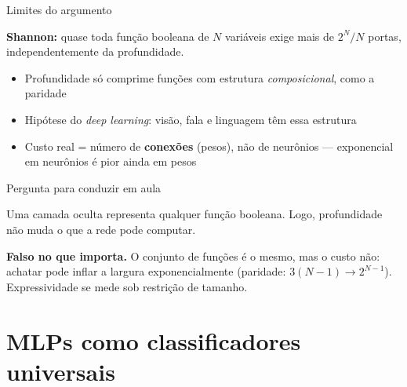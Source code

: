 \documentclass[aspectratio=169, 11pt]{beamer}
\begin{document}
\begin{frame}{Limites do argumento}

  \begin{alertabox}
    \textbf{Shannon:} quase toda função booleana de $N$ variáveis exige mais
    de $2^N/N$ portas, \alert{independentemente da profundidade}.
  \end{alertabox}

  \smallskip
  \begin{itemize}\setlength{\itemsep}{0.25ex}
    \item Profundidade só comprime funções com estrutura
          \emph{composicional}, como a paridade
    \item Hipótese do \emph{deep learning}: visão, fala e linguagem têm
          essa estrutura
    \item Custo real = número de \textbf{conexões} (pesos), não de
          neurônios — exponencial em neurônios é pior ainda em pesos
  \end{itemize}
\end{frame}

\begin{frame}{Pergunta para conduzir em aula}

  \begin{quizbox}
    Uma camada oculta representa qualquer função booleana. Logo,
    profundidade não muda o que a rede pode computar.

    \smallskip
  \end{quizbox}

  \pause

  \begin{respbox}
    \textbf{Falso no que importa.} O conjunto de funções é o mesmo, mas o
    custo não: achatar pode inflar a largura exponencialmente (paridade:
    $3(N-1) \to 2^{N-1}$). Expressividade se mede \alert{sob restrição de
    tamanho}.
  \end{respbox}
\end{frame}

\section{MLPs como classificadores universais}
\end{document}
